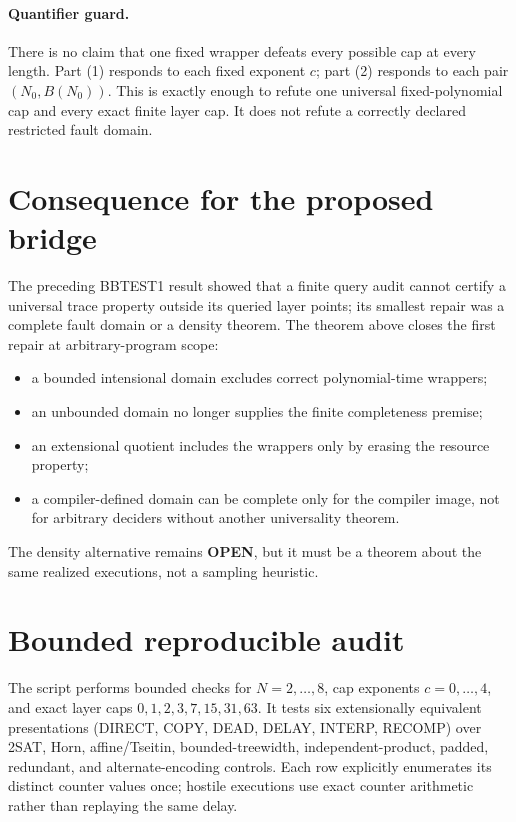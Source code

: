 \documentclass[11pt]{article}
\newcommand{\OPEN}{\textbf{OPEN}}
\begin{document}
\paragraph{Quantifier guard.}
There is no claim that one fixed wrapper defeats every possible cap at every
length.  Part (1) responds to each fixed exponent \(c\); part (2) responds to
each pair \((N_0,B(N_0))\).  This is exactly enough to refute one universal
fixed-polynomial cap and every exact finite layer cap.  It does not refute a
correctly declared restricted fault domain.

\section*{Consequence for the proposed bridge}
The preceding BBTEST1 result showed that a finite query audit cannot certify a
universal trace property outside its queried layer points; its smallest repair
was a complete fault domain or a density theorem.  The theorem above closes
the first repair at arbitrary-program scope:
\begin{itemize}
\item a bounded intensional domain excludes correct polynomial-time wrappers;
\item an unbounded domain no longer supplies the finite completeness premise;
\item an extensional quotient includes the wrappers only by erasing the
resource property;
\item a compiler-defined domain can be complete only for the compiler image,
not for arbitrary deciders without another universality theorem.
\end{itemize}
The density alternative remains \OPEN{}, but it must be a theorem about the
same realized executions, not a sampling heuristic.

\section*{Bounded reproducible audit}
The script
performs bounded checks for \(N=2,\ldots,8\), cap exponents
\(c=0,\ldots,4\), and exact layer caps
\(0,1,2,3,7,15,31,63\).  It tests six extensionally equivalent
presentations (DIRECT, COPY, DEAD, DELAY, INTERP, RECOMP) over 2SAT, Horn,
affine/Tseitin, bounded-treewidth, independent-product, padded, redundant, and
alternate-encoding controls.  Each row explicitly enumerates its distinct
counter values once; hostile executions use exact counter arithmetic rather
than replaying the same delay.
\end{document}
